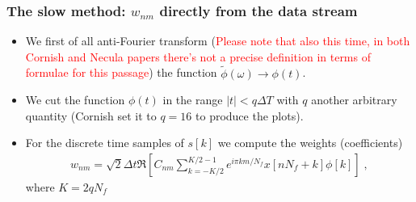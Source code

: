 \documentclass{article}
\begin{document}
\subsubsection{The slow method: $w_{nm}$ directly from the data stream}
\begin{itemize}
    \item We first of all anti-Fourier transform (\textcolor{red}{Please note that also this time, in both Cornish and Necula papers there's not a precise definition in terms of formulae for this passage}) the function $\tilde \phi(\omega)\to\phi(t)$.
    \item We cut the function $\phi(t)$ in the range $|t|<q\Delta T$ with $q$ another arbitrary quantity (Cornish set it to $q=16$ to produce the plots).
    \item For the discrete time samples of $s[k]$ we compute the weights (coefficients)
    \begin{align}
    \label{eq:direct}
w_{n m}=\sqrt{2} \Delta t \Re \left[C_{n m} \sum_{k=-K / 2}^{K / 2-1} e^{i \pi k m / N_f} x\left[n N_f+k\right] \phi[k]\right]\;,
\end{align}
where $K=2qN_f$
\end{itemize}
\end{document}
